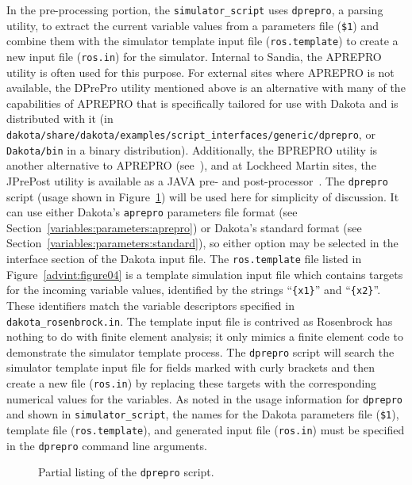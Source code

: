 In the pre-processing portion, the \texttt{simulator\_script} uses
\texttt{dprepro}, a parsing utility, to extract the
current variable values from a parameters file (\texttt{\$1})
and combine them with the simulator template input file
(\texttt{ros.template}) to create a new input file (\texttt{ros.in})
for the simulator. Internal to Sandia, the APREPRO utility is often
used for this purpose. For external sites where APREPRO is not
available, the DPrePro utility mentioned above is an alternative with
many of the capabilities of APREPRO that is specifically tailored for
use with Dakota and is distributed with it (in
\\ \texttt{dakota/share/dakota/examples/script\_interfaces/generic/dprepro}, or {\tt
Dakota/bin} in a binary distribution). Additionally, the BPREPRO
utility is another alternative to APREPRO (see~\cite{WalXX}), and at
Lockheed Martin sites, the JPrePost utility is available as a JAVA
pre- and post-processor~\cite{Fla}. The \texttt{dprepro} script
(usage shown in Figure~\ref{advint:figure03}) will be used here for
simplicity of discussion. It can use either Dakota's \texttt{aprepro}
parameters file format (see
Section~\ref{variables:parameters:aprepro}) or Dakota's standard
format (see Section~\ref{variables:parameters:standard}), so either
option may be selected in the interface section of the Dakota input
file. The \texttt{ros.template} file listed in
Figure~\ref{advint:figure04} is a template simulation input file which
contains targets for the incoming variable values, identified by the
strings ``\texttt{\{x1\}}'' and ``\texttt{\{x2\}}''. These
identifiers match the variable descriptors specified in
\texttt{dakota\_rosenbrock.in}. The template input file is contrived
as Rosenbrock has nothing to do with finite element analysis; it only
mimics a finite element code to demonstrate the simulator
template process. The \texttt{dprepro} script will search the
simulator template input file for fields marked with curly
brackets and then create a new file (\texttt{ros.in}) by replacing
these targets with the corresponding numerical values for the
variables. As noted in the usage information for \texttt{dprepro} and
shown in \texttt{simulator\_script}, the names for the Dakota
parameters file (\texttt{\$1}), template file
(\texttt{ros.template}), and generated input file (\texttt{ros.in})
must be specified in the \texttt{dprepro} command line arguments.

\begin{figure}
  \centering
  \begin{bigbox}
    \begin{small}
    \end{small}
  \end{bigbox}
  \caption{Partial listing of the \texttt{dprepro} script.}
  \label{advint:figure03}
\end{figure}

